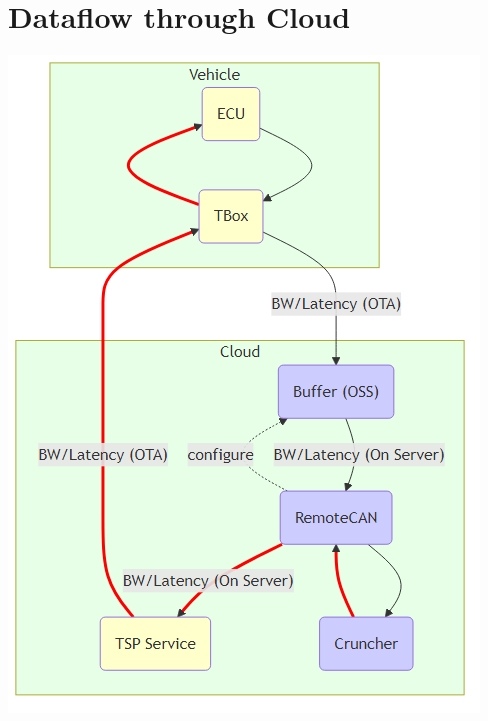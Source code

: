 \documentclass[a4paper, 11pt]{article}
\begin{document}
\section{Dataflow through Cloud}
\label{sec:org800f7c0}

\begin{center}
\includegraphics[width=.9\linewidth]{./img/data_flow_cloud.png}
\label{Fig. Dataflow through cloud}
\end{center}
\end{document}
